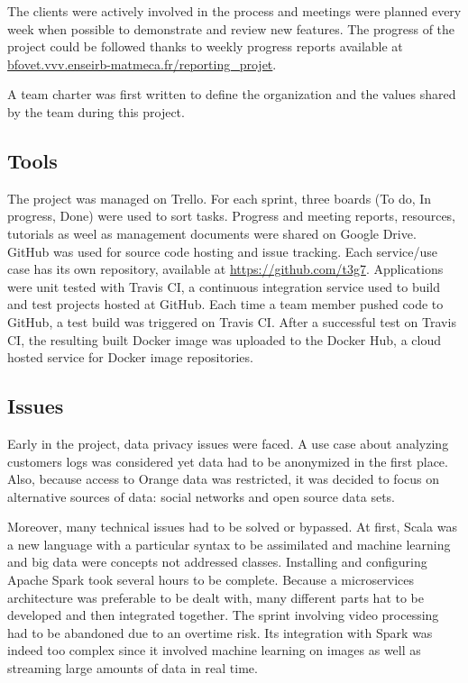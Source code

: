 \documentclass[11pt]{article}
\begin{document}
The clients were actively involved in the process and meetings were planned every week when possible to demonstrate and review new features. The progress of the project could be followed thanks to weekly progress reports available at \url{bfovet.vvv.enseirb-matmeca.fr/reporting_projet}.

A team charter was first written to define the organization and the values shared by the team during this project.

\subsection{Tools}

The project was managed on \textsf{Trello}. For each sprint, three boards (To do, In progress, Done) were used to sort tasks.
Progress and meeting reports, resources, tutorials as weel as management documents were shared on \textsf{Google Drive}.
\textsf{GitHub} was used for source code hosting and issue tracking. Each service/use case has its own repository, available at \url{https://github.com/t3g7}.
Applications were unit tested with \textsf{Travis CI}, a continuous integration service used to build and test projects hosted at \textsf{GitHub}. Each time a team member pushed code to \textsf{GitHub}, a test build was triggered on \textsf{Travis CI}.
After a successful test on \textsf{Travis CI}, the resulting built \textsf{Docker} image was uploaded to the \textsf{Docker Hub}, a cloud hosted service for \textsf{Docker} image repositories.

\subsection{Issues}

Early in the project, data privacy issues were faced. A use case about analyzing customers logs was considered yet data had to be anonymized in the first place. Also, because access to \textsf{Orange} data was restricted, it was decided to focus on alternative sources of data: social networks and open source data sets.

Moreover, many technical issues had to be solved or bypassed. At first, \textsf{Scala} was a new language with a particular syntax to be assimilated and machine learning and big data were concepts not addressed classes.
Installing and configuring \textsf{Apache Spark} took several hours to be complete. Because a microservices architecture was preferable to be dealt with, many different parts hat to be developed and then integrated together.
The sprint involving video processing had to be abandoned due to an overtime risk. Its integration with \textsf{Spark} was indeed too complex since it involved machine learning on images as well as streaming large amounts of data in real time.
\end{document}
